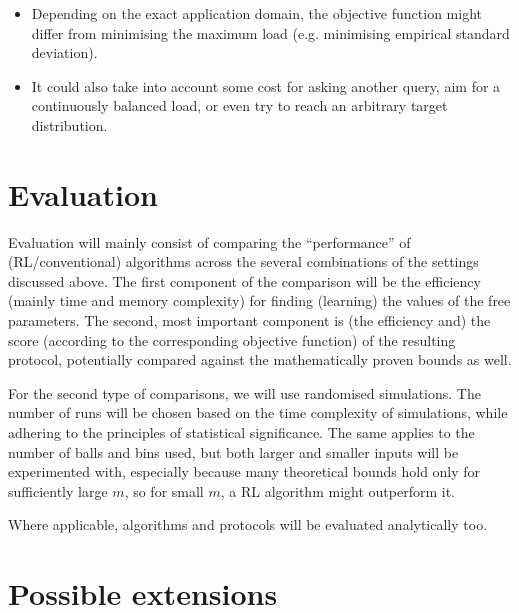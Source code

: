 \begin{itemize}
    \begin{itemize}
        \item
        Depending on the exact application domain, the objective function might differ from minimising the maximum load (e.g. minimising empirical standard deviation).
        \item
        It could also take into account some cost for asking another query, aim for a continuously balanced load, or even try to reach an arbitrary target distribution.
    \end{itemize}
\end{itemize}


\section*{Evaluation}

Evaluation will mainly consist of comparing the ``performance'' of (RL/conventional) algorithms across the several combinations of the settings discussed above. The first component of the comparison will be the efficiency (mainly time and memory complexity) for finding (learning) the values of the free parameters. The second, most important component is (the efficiency and) the score (according to the corresponding objective function) of the resulting protocol, potentially compared against the mathematically proven bounds as well.

For the second type of comparisons, we will use randomised simulations. The number of runs will be chosen based on the time complexity of simulations, while adhering to the principles of statistical significance. The same applies to the number of balls and bins used, but both larger and smaller inputs will be experimented with, especially because many theoretical bounds hold only for sufficiently large $m$, so for small $m$, a RL algorithm might outperform it.

Where applicable, algorithms and protocols will be evaluated analytically too.

\section*{Possible extensions}

